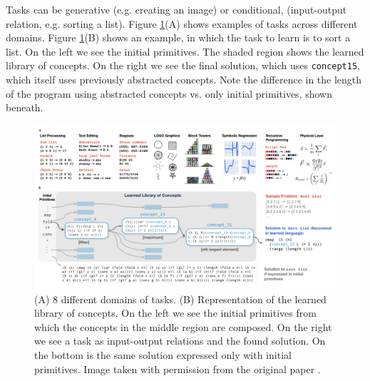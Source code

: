 Tasks can be generative (e.g. creating an image) or conditional, (input-output relation, e.g. sorting a list).
Figure \ref{fig:conc_library}(A) shows examples of tasks across different domains. 
Figure \ref{fig:conc_library}(B) shows an example, in which the task to learn is to sort a list. On the left we see the initial primitives. The shaded region shows the learned library of concepts. On the right we see the final solution, which uses \texttt{concept15}, which itself uses previously abstracted concepts. Note the difference in the length of the program using abstracted concepts vs. only initial primitives, shown beneath.

\begin{figure}[h]
    \centering
    \includegraphics[width=\textwidth]{../img/conc_library.png}
    \caption{(A) 8 different domains of tasks. (B) Representation of the learned library of concepts. On the left we see the initial primitives from which the concepts in the middle region are composed. On the right we see a task as input-output relations and the found solution. On the bottom is the same solution expressed only with initial primitives. Image taken with permission from the original paper \cite{ellis_dreamcoder_2021}.}
    \label{fig:conc_library}
\end{figure}



